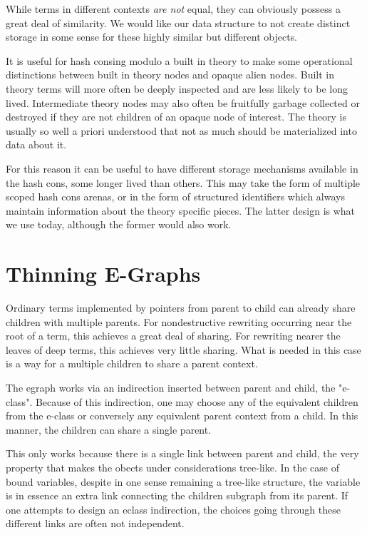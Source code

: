 \documentclass{article}%
\begin{document}

While terms in different contexts \textit{are not} equal, they can obviously possess a great deal of similarity. We would like our data structure to not create distinct storage in some sense for these highly similar but different objects.


It is useful for hash consing modulo a built in theory to make some operational distinctions between built in theory nodes and opaque alien nodes. Built in theory terms will more often be deeply inspected and are less likely to be long lived. Intermediate theory nodes may also often be fruitfully  garbage collected or destroyed if they are not children of an opaque node of interest. The theory is usually so well a priori understood that not as much should be materialized into data about it.

For this reason it can be useful to have different storage mechanisms available in the hash cons, some longer lived than others. This may take the form of multiple scoped hash cons arenas, or in the form of structured identifiers which always maintain information about the theory specific pieces. The latter design is what we use today, although the former would also work.


\section{Thinning E-Graphs}

Ordinary terms implemented by pointers from parent to child can already share children with multiple parents. For nondestructive rewriting occurring near the root of a term, this achieves a great deal of sharing. For rewriting nearer the leaves of deep terms, this achieves very little sharing. What is needed in this case is a way for a multiple children to share a parent context.

The egraph works via an indirection inserted between parent and child, the "e-class". Because of this indirection, one may choose any of the equivalent children from the e-class or conversely any equivalent parent context from a child. In this manner, the children can share a single parent.

This only works because there is a single link between parent and child, the very property that makes the obects under considerations tree-like. In the case of bound variables, despite in one sense remaining a tree-like structure, the variable is in essence an extra link connecting the children subgraph from its parent. If one attempts to design an eclass indirection, the choices going through these different links are often not independent.
\end{document}
